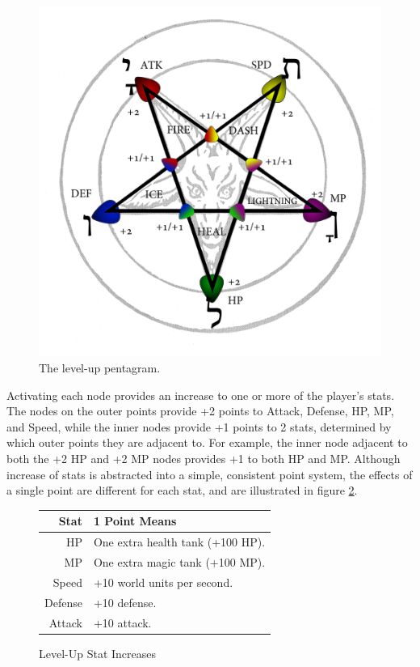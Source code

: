 \documentclass{article}
\begin{document}
\begin{figure}[h!]

\includegraphics[width=5in]{Graphics/LevelupPentagram.png}
\caption{The level-up pentagram.}
\label{Pentagram}

\end{figure}

Activating each node provides an increase to one or more of the player's stats.  The nodes on the outer points provide +2 points to Attack, Defense, HP, MP, and Speed, while the inner nodes provide +1 points to 2 stats, determined by which outer points they are adjacent to.  For example, the inner node adjacent to both the +2 HP and +2 MP nodes provides +1 to both HP and MP.  Although increase of stats is abstracted into a simple, consistent point system, the effects of a single point are different for each stat, and are illustrated in figure \ref{LevelupStats}.

\begin{figure}[h!]
\begin{tabular}{|r|l|}
\hline
Stat & 1 Point Means \\
\hline
HP & One extra health tank (+100 HP). \\
MP & One extra magic tank (+100 MP). \\
Speed & +10 world units per second. \\
Defense & +10 defense. \\
Attack & +10 attack. \\
\hline
\end{tabular}
\caption{Level-Up Stat Increases}
\label{LevelupStats}
\end{figure}
\end{document}
